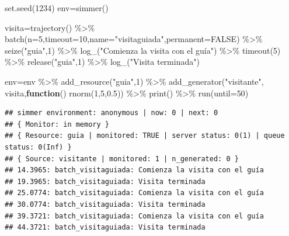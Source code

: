 \documentclass[
]{book}
\newenvironment{Shaded}{\begin{snugshade}}{\end{snugshade}}
\newcommand{\AttributeTok}[1]{\textcolor[rgb]{0.77,0.63,0.00}{#1}}
\newcommand{\ConstantTok}[1]{\textcolor[rgb]{0.00,0.00,0.00}{#1}}
\newcommand{\ControlFlowTok}[1]{\textcolor[rgb]{0.13,0.29,0.53}{\textbf{#1}}}
\newcommand{\DecValTok}[1]{\textcolor[rgb]{0.00,0.00,0.81}{#1}}
\newcommand{\FloatTok}[1]{\textcolor[rgb]{0.00,0.00,0.81}{#1}}
\newcommand{\FunctionTok}[1]{\textcolor[rgb]{0.00,0.00,0.00}{#1}}
\newcommand{\NormalTok}[1]{#1}
\newcommand{\OtherTok}[1]{\textcolor[rgb]{0.56,0.35,0.01}{#1}}
\newcommand{\SpecialCharTok}[1]{\textcolor[rgb]{0.00,0.00,0.00}{#1}}
\newcommand{\StringTok}[1]{\textcolor[rgb]{0.31,0.60,0.02}{#1}}
\theoremstyle{definition}
\theoremstyle{definition}
\theoremstyle{definition}
\theoremstyle{definition}
\theoremstyle{remark}
\begin{document}
\begin{Shaded}
\begin{Highlighting}[]
\FunctionTok{set.seed}\NormalTok{(}\DecValTok{1234}\NormalTok{)}
\NormalTok{env}\OtherTok{=}\FunctionTok{simmer}\NormalTok{()}

\NormalTok{visita}\OtherTok{=}\FunctionTok{trajectory}\NormalTok{() }\SpecialCharTok{\%\textgreater{}\%}
  \FunctionTok{batch}\NormalTok{(}\AttributeTok{n=}\DecValTok{5}\NormalTok{,}\AttributeTok{timeout=}\DecValTok{10}\NormalTok{,}\AttributeTok{name=}\StringTok{"visitaguiada"}\NormalTok{,}\AttributeTok{permanent=}\ConstantTok{FALSE}\NormalTok{) }\SpecialCharTok{\%\textgreater{}\%}
  \FunctionTok{seize}\NormalTok{(}\StringTok{"guia"}\NormalTok{,}\DecValTok{1}\NormalTok{) }\SpecialCharTok{\%\textgreater{}\%}
  \FunctionTok{log\_}\NormalTok{(}\StringTok{"Comienza la visita con el guía"}\NormalTok{) }\SpecialCharTok{\%\textgreater{}\%}
  \FunctionTok{timeout}\NormalTok{(}\DecValTok{5}\NormalTok{) }\SpecialCharTok{\%\textgreater{}\%}
  \FunctionTok{release}\NormalTok{(}\StringTok{"guia"}\NormalTok{,}\DecValTok{1}\NormalTok{) }\SpecialCharTok{\%\textgreater{}\%}
  \FunctionTok{log\_}\NormalTok{(}\StringTok{"Visita terminada"}\NormalTok{) }
  

\NormalTok{env}\OtherTok{=}\NormalTok{env }\SpecialCharTok{\%\textgreater{}\%}
  \FunctionTok{add\_resource}\NormalTok{(}\StringTok{"guia"}\NormalTok{,}\DecValTok{1}\NormalTok{) }\SpecialCharTok{\%\textgreater{}\%}
  \FunctionTok{add\_generator}\NormalTok{(}\StringTok{"visitante"}\NormalTok{, visita,}\ControlFlowTok{function}\NormalTok{() }\FunctionTok{rnorm}\NormalTok{(}\DecValTok{1}\NormalTok{,}\DecValTok{5}\NormalTok{,}\FloatTok{0.5}\NormalTok{)) }\SpecialCharTok{\%\textgreater{}\%}
  \FunctionTok{print}\NormalTok{() }\SpecialCharTok{\%\textgreater{}\%}
  \FunctionTok{run}\NormalTok{(}\AttributeTok{until=}\DecValTok{50}\NormalTok{) }
\end{Highlighting}
\end{Shaded}

\begin{verbatim}
## simmer environment: anonymous | now: 0 | next: 0
## { Monitor: in memory }
## { Resource: guia | monitored: TRUE | server status: 0(1) | queue status: 0(Inf) }
## { Source: visitante | monitored: 1 | n_generated: 0 }
## 14.3965: batch_visitaguiada: Comienza la visita con el guía
## 19.3965: batch_visitaguiada: Visita terminada
## 25.0774: batch_visitaguiada: Comienza la visita con el guía
## 30.0774: batch_visitaguiada: Visita terminada
## 39.3721: batch_visitaguiada: Comienza la visita con el guía
## 44.3721: batch_visitaguiada: Visita terminada
\end{verbatim}
\end{document}
